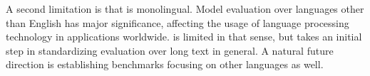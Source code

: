 A second limitation is that \scrolls{} is monolingual. Model evaluation over languages other than English has major significance, affecting the usage of language processing technology in applications worldwide. \scrolls{} is limited in that sense, but takes an initial step in standardizing evaluation over long text in general. A natural future direction is establishing benchmarks focusing on other languages as well.


